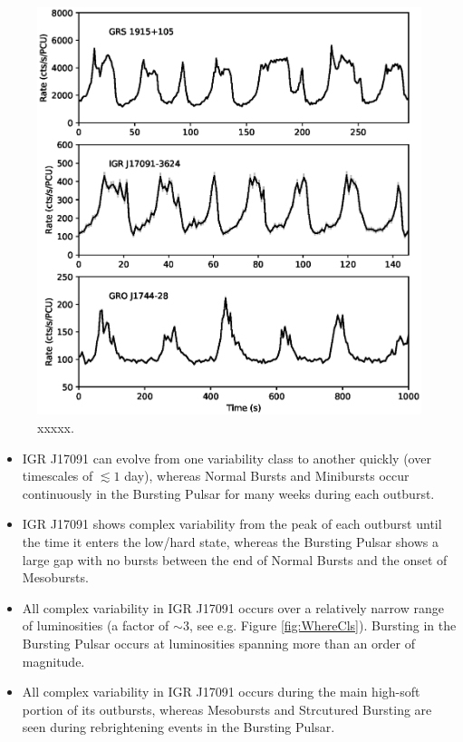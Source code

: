 \begin{figure}
  \centering
  \includegraphics[width=.9\linewidth, trim= 0mm 0mm 0mm 0mm,clip]{images/BPco2.eps}
  \caption[Lightcurves from GRS 1915, IGR J17091 and the Bursting Pulsar, showing lightcurves with Structured Bursting-like behaviour for each.]{xxxxx.}
  \label{fig:BP_with_IGR2}
\end{figure}

\begin{itemize}
\item IGR J17091 can evolve from one variability class to another quickly (over timescales of $\lesssim1$ day), whereas Normal Bursts and Minibursts occur continuously in the Bursting Pulsar for many weeks during each outburst.
\item IGR J17091 shows complex variability from the peak of each outburst until the time it enters the low/hard state, whereas the Bursting Pulsar shows a large gap with no bursts between the end of Normal Bursts and the onset of Mesobursts.
\item All complex variability in IGR J17091 occurs over a relatively narrow range of luminosities (a factor of $\sim3$, see e.g. Figure \ref{fig:WhereCls}).  Bursting in the Bursting Pulsar occurs at luminosities spanning more than an order of magnitude.
\item All complex variability in IGR J17091 occurs during the main high-soft portion of its outbursts, whereas Mesobursts and Strcutured Bursting are seen during rebrightening events in the Bursting Pulsar.
\end{itemize}

